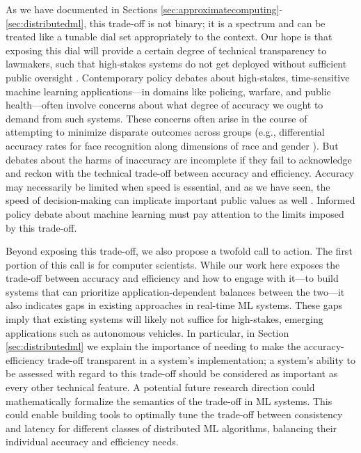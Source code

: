 \documentclass[sigplan,screen]{acmart}
\begin{document}
As we have documented in Sections \ref{sec:approximatecomputing}-\ref{sec:distributedml}, this trade-off is not binary; it is a spectrum and can be treated like a tunable dial set appropriately to the context. Our hope is that exposing this dial will provide a certain degree of technical transparency to lawmakers, such that high-stakes systems do not get deployed without sufficient public oversight \cite{cooper2020law, cooper2019isp}. Contemporary policy debates about high-stakes, time-sensitive machine learning applications---in domains like policing, warfare, and public health---often involve concerns about what degree of accuracy we ought to demand from such systems. These concerns often arise in the course of attempting to minimize disparate outcomes across groups (e.g., differential accuracy rates for face recognition along dimensions of race and gender \cite{buolamwini2018gender}). But debates about the harms of inaccuracy are incomplete if they fail to acknowledge and reckon with the technical trade-off between accuracy and efficiency. Accuracy may necessarily be limited when speed is essential, and as we have seen, the speed of decision-making can implicate important public values as well \cite{cooper2020law}. Informed policy debate about machine learning must pay attention to the limits imposed by this trade-off.

Beyond exposing this trade-off, we also propose a twofold call to action. The first portion of this call is for computer scientists. While our work here exposes the trade-off between accuracy and efficiency and how to engage with it---to build systems that can prioritize application-dependent balances between the two---it also indicates gaps in existing approaches in real-time ML systems. These gaps imply that existing systems will likely not suffice for high-stakes, emerging applications such as autonomous vehicles. In particular, in Section \ref{sec:distributedml} we explain the importance of needing to make the accuracy-efficiency trade-off transparent in a system's implementation; a system's ability to be assessed with regard to this trade-off should be considered as important as every other technical feature. A potential future research direction could mathematically formalize the semantics of the trade-off in ML systems. This could enable building tools to optimally tune the trade-off between consistency and latency for different classes of distributed ML algorithms, balancing their individual accuracy and efficiency needs.
\end{document}
